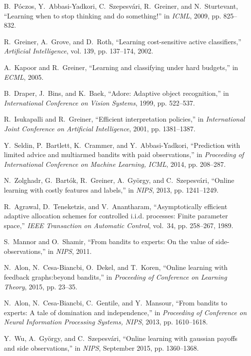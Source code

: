 \documentclass[11pt]{article} %
\begin{document}
\begin{thebibliography}{10}
B.~P{\'o}czos, Y.~Abbasi-Yadkori, C.~Szepesv{\'a}ri, R.~Greiner, and
  N.~Sturtevant, ``Learning when to stop thinking and do something!'' in
  \emph{ICML}, 2009, pp. 825--832.

R.~Greiner, A.~Grove, and D.~Roth, ``Learning cost-sensitive active
  classifiers,'' \emph{Artificial Intelligence}, vol. 139, pp. 137--174, 2002.

A.~Kapoor and R.~Greiner, ``Learning and classifying under hard budgets,'' in
  \emph{{ECML}}, 2005.

B.~Draper, J.~Bins, and K.~Baek, ``Adore: Adaptive object recognition,'' in
  \emph{International Conference on Vision Systems}, 1999, pp. 522--537.

R.~Isukapalli and R.~Greiner, ``Efficient interpretation policies,'' in
  \emph{International Joint Conference on Artificial Intelligence}, 2001, pp.
  1381--1387.

Y.~Seldin, P.~Bartlett, K.~Crammer, and Y.~Abbasi-Yadkori, ``Prediction with
  limited advice and multiarmed bandits with paid observations,'' in
  \emph{Proceeding of International Conference on Machine Learning, ICML},
  2014, pp. 208--287.

N.~Zolghadr, G.~Bart\'ok, R.~Greiner, A.~Gy\"orgy, and C.~Szepesv\'ari,
  ``Online learning with costly features and labels,'' in \emph{NIPS}, 2013,
  pp. 1241--1249.

R.~Agrawal, D.~Teneketzis, and V.~Anantharam, ``Asymptotically efficient
  adaptive allocation schemes for controlled i.i.d. processes: Finite parameter
  space,'' \emph{IEEE Transaction on Automatic Control}, vol.~34, pp. 258--267,
  1989.

S.~Mannor and O.~Shamir, ``From bandits to experts: On the value of
  side-observations,'' in \emph{NIPS}, 2011.

N.~Alon, N.~Cesa-Biancbi, O.~Dekel, and T.~Koren, ``Online learning with
  feedback graphs:beyond bandits,'' in \emph{Proceeding of Conference on
  Learning Theory}, 2015, pp. 23--35.

N.~Alon, N.~Cesa-Biancbi, C.~Gentile, and Y.~Mansour, ``From bandits to
  experts: A tale of domination and independence,'' in \emph{Proceeding of
  Conference on Neural Information Processing Systems, NIPS}, 2013, pp.
  1610--1618.

Y.~Wu, A.~Gy{\"o}rgy, and C.~Szepesv{\'a}ri, ``Online learning with gaussian
  payoffs and side observations,'' in \emph{NIPS}, September 2015, pp.
  1360--1368.

\end{thebibliography}
\end{document}
